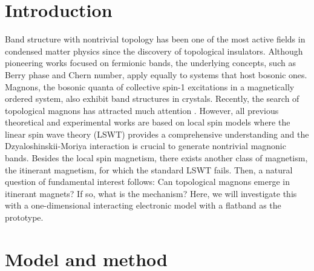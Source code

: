 \documentclass[a0,portrait]{a0poster}
\newcommand\myfigure[6]{%
  \ifdim#2>.8\linewidth
    {%
      \centering
      \texttt{[image: \#4]}%
      \captionof{figure}{#5}%
      \label{#6}%
    }%
  \else
  \begin{figure}
    \texttt{[image: \#4]}
    \caption{#5}
    \label{#6}%
  \end{figure}
  \fi
}
\begin{document}
\begin{multicols}{2} %


\color{SaddleBrown} %
\section*{Introduction}
\par Band structure with nontrivial topology has been one of the most active fields in condensed matter physics since the discovery of topological insulators. Although pioneering works focused on fermionic bands, the underlying concepts, such as Berry phase and Chern number, apply equally to systems that host bosonic ones. Magnons, the bosonic quanta of collective spin-1 excitations in a magnetically ordered system, also exhibit band structures in crystals. Recently, the search of topological magnons has attracted much attention \cite{OIKSNT_S2010,ZRWL_PRB2013,CHFSBNL_PRL2015}. However, all previous theoretical and experimental works are based on local spin models where the linear spin wave theory (LSWT) provides a comprehensive understanding and the Dzyaloshinskii-Moriya interaction is crucial to generate nontrivial magnonic bands. Besides the local spin magnetism, there exists another class of magnetism, the itinerant magnetism, for which the standard LSWT fails. Then, a natural question of fundamental interest follows: Can topological magnons emerge in itinerant magnets? If so, what is the mechanism? Here, we will investigate this with a one-dimensional interacting electronic model with a flatband as the prototype.


\color{DarkSlateGray} %
\section*{Model and method}

\myfigure{R}{0.4\linewidth}{\linewidth}{lattice_poster.pdf}{(a) Schematic illustration of Eq. (\ref{model}). (b) Band structure of the free part of Eq. (\ref{model}) with $\epsilon=\lambda^2/t-2t$. Here, $\lambda=1.4t$. (c) Illustration of the creation of a spin-1 excitation with a center-of-mass momentum $q$ on the ferromagnetic ground state in the PED method.}
{lattice}


\end{multicols}
\end{document}
